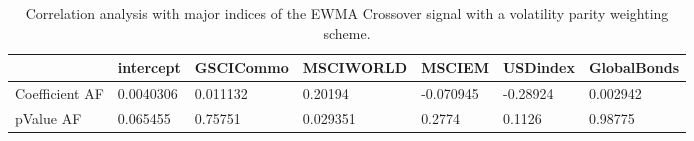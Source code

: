 \begin{table}[H]
\centering
\begin{tabular}{lllllll}
\hline& intercept & GSCICommo & MSCIWORLD & MSCIEM & USDindex & GlobalBonds \\ 
\hline 
Coefficient AF & 0.0040306 & 0.011132 & 0.20194 & -0.070945 & -0.28924 & 0.002942 \\ 
pValue AF & 0.065455 & 0.75751 & 0.029351 & 0.2774 & 0.1126 & 0.98775 \\ 
\hline
\end{tabular}
\caption{Correlation analysis with major indices of the EWMA Crossover signal with a volatility parity weighting scheme.}
\label{MBBSVPOQ_AFACTOR}
\end{table}